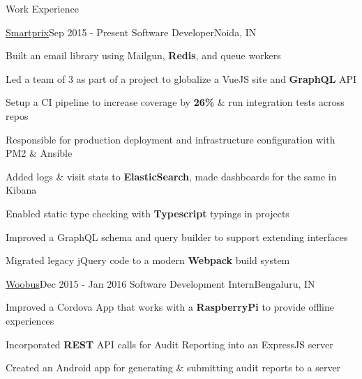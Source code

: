 \documentclass{resume} %
\begin{document}
\begin{rSection}{Work Experience}

    \begin{rSubsection}{\href{https://github.com/smartprix}{Smartprix}}{Sep 2015 - Present}
        {Software Developer}{Noida, IN}

        \item Built an email library using Mailgun, \textbf{Redis}, and queue workers
        \item Led a team of 3 as part of a project to globalize a VueJS site and \textbf{GraphQL} API
        \item Setup a CI pipeline to increase coverage by \textbf{26\%} \& run integration tests across repos
        \item Responsible for production deployment and infrastructure configuration with PM2 \& Ansible 
        \item Added logs \& visit stats to \textbf{ElasticSearch}, made dashboards for the same in Kibana
        \item Enabled static type checking with \textbf{Typescript} typings in projects
        \item Improved a GraphQL schema and query builder to support extending interfaces
        \item Migrated legacy jQuery code to a modern \textbf{Webpack} build system
    \end{rSubsection}


    \begin{rSubsection}{\href{https://github.com/rohit-smpx?tab=repositories&q=Woobus&type=public}{Woobus}}{Dec 2015 - Jan 2016}
        {Software Development Intern}{Bengaluru, IN}

        \item Improved a Cordova App that works with a \textbf{RaspberryPi} to provide offline experiences
        \item Incorporated \textbf{REST} API calls for Audit Reporting into an ExpressJS server
        \item Created an Android app for generating \& submitting audit reports to a server
    \end{rSubsection}

\end{rSection}
\end{document}
